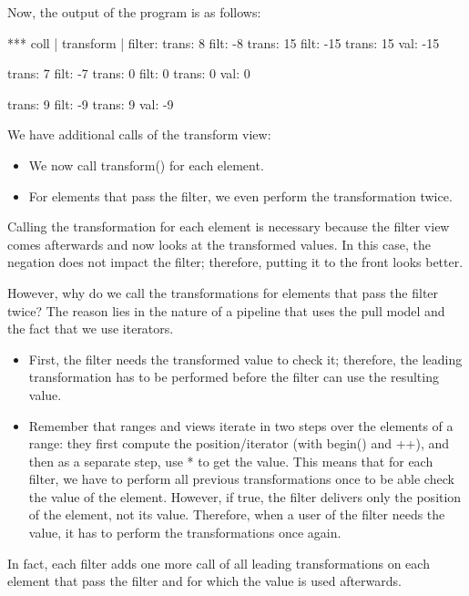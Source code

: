 Now, the output of the program is as follows:

\begin{shell}
*** coll | transform | filter:
trans: 8
filt: -8
trans: 15
filt: -15
trans: 15
val: -15

trans: 7
filt: -7
trans: 0
filt: 0
trans: 0
val: 0

trans: 9
filt: -9
trans: 9
val: -9
\end{shell}

We have additional calls of the transform view:

\begin{itemize}
\item
We now call transform() for each element.

\item
For elements that pass the filter, we even perform the transformation twice.
\end{itemize}

Calling the transformation for each element is necessary because the filter view comes afterwards and now looks at the transformed values. In this case, the negation does not impact the filter; therefore, putting it to the front looks better.

However, why do we call the transformations for elements that pass the filter twice? The reason lies in the nature of a pipeline that uses the pull model and the fact that we use iterators.

\begin{itemize}
\item
First, the filter needs the transformed value to check it; therefore, the leading transformation has to be performed before the filter can use the resulting value.
	
\item
Remember that ranges and views iterate in two steps over the elements of a range: they first compute the position/iterator (with begin() and ++), and then as a separate step, use * to get the value. This means that for each filter, we have to perform all previous transformations once to be able check the value of the element. However, if true, the filter delivers only the position of the element, not its value. Therefore, when a user of the filter needs the value, it has to perform the transformations once again.
\end{itemize}

In fact, each filter adds one more call of all leading transformations on each element that pass the filter and for which the value is used afterwards.

